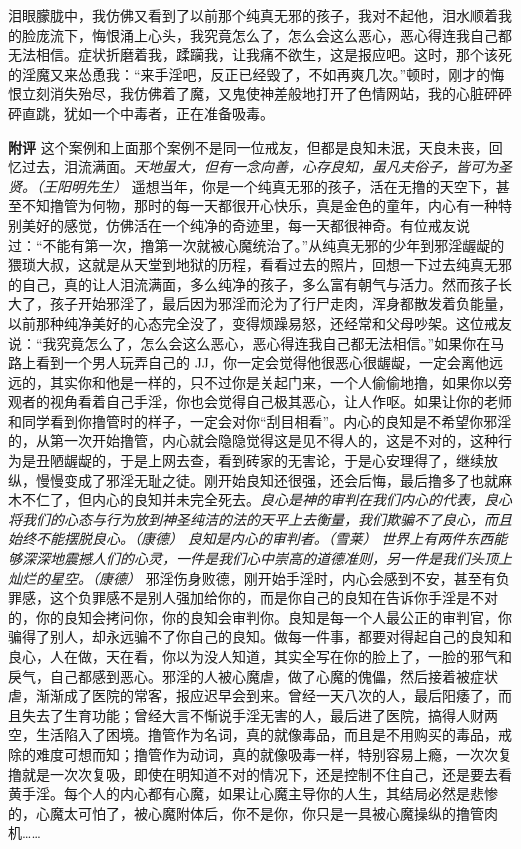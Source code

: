 \begin{case}
    泪眼朦胧中，我仿佛又看到了以前那个纯真无邪的孩子，我对不起他，泪水顺着我的脸庞流下，悔恨涌上心头，我究竟怎么了，怎么会这么恶心，恶心得连我自己都无法相信。症状折磨着我，蹂躏我，让我痛不欲生，这是报应吧。这时，那个该死的淫魔又来怂恿我：“来手淫吧，反正已经毁了，不如再爽几次。”顿时，刚才的悔恨立刻消失殆尽，我仿佛着了魔，又鬼使神差般地打开了色情网站，我的心脏砰砰砰直跳，犹如一个中毒者，正在准备吸毒。

    \textbf{附评} 这个案例和上面那个案例不是同一位戒友，但都是良知未泯，天良未丧，回忆过去，泪流满面。\textit{天地虽大，但有一念向善，心存良知，虽凡夫俗子，皆可为圣贤。（王阳明先生）} 遥想当年，你是一个纯真无邪的孩子，活在无撸的天空下，甚至不知撸管为何物，那时的每一天都很开心快乐，真是金色的童年，内心有一种特别美好的感觉，仿佛活在一个纯净的奇迹里，每一天都很神奇。有位戒友说过：“不能有第一次，撸第一次就被心魔统治了。”从纯真无邪的少年到邪淫龌龊的猥琐大叔，这就是从天堂到地狱的历程，看看过去的照片，回想一下过去纯真无邪的自己，真的让人泪流满面，多么纯净的孩子，多么富有朝气与活力。然而孩子长大了，孩子开始邪淫了，最后因为邪淫而沦为了行尸走肉，浑身都散发着负能量，以前那种纯净美好的心态完全没了，变得烦躁易怒，还经常和父母吵架。这位戒友说：“我究竟怎么了，怎么会这么恶心，恶心得连我自己都无法相信。”如果你在马路上看到一个男人玩弄自己的 JJ，你一定会觉得他很恶心很龌龊，一定会离他远远的，其实你和他是一样的，只不过你是关起门来，一个人偷偷地撸，如果你以旁观者的视角看着自己手淫，你也会觉得自己极其恶心，让人作呕。如果让你的老师和同学看到你撸管时的样子，一定会对你“刮目相看”。内心的良知是不希望你邪淫的，从第一次开始撸管，内心就会隐隐觉得这是见不得人的，这是不对的，这种行为是丑陋龌龊的，于是上网去查，看到砖家的无害论，于是心安理得了，继续放纵，慢慢变成了邪淫无耻之徒。刚开始良知还很强，还会后悔，最后撸多了也就麻木不仁了，但内心的良知并未完全死去。\textit{良心是神的审判在我们内心的代表，良心将我们的心态与行为放到神圣纯洁的法的天平上去衡量，我们欺骗不了良心，而且始终不能摆脱良心。（康德）} \textit{良知是内心的审判者。（雪莱）} \textit{世界上有两件东西能够深深地震撼人们的心灵，一件是我们心中崇高的道德准则，另一件是我们头顶上灿烂的星空。（康德）} 邪淫伤身败德，刚开始手淫时，内心会感到不安，甚至有负罪感，这个负罪感不是别人强加给你的，而是你自己的良知在告诉你手淫是不对的，你的良知会拷问你，你的良知会审判你。良知是每一个人最公正的审判官，你骗得了别人，却永远骗不了你自己的良知。做每一件事，都要对得起自己的良知和良心，人在做，天在看，你以为没人知道，其实全写在你的脸上了，一脸的邪气和戾气，自己都感到恶心。邪淫的人被心魔虐，做了心魔的傀儡，然后接着被症状虐，渐渐成了医院的常客，报应迟早会到来。曾经一天八次的人，最后阳痿了，而且失去了生育功能；曾经大言不惭说手淫无害的人，最后进了医院，搞得人财两空，生活陷入了困境。撸管作为名词，真的就像毒品，而且是不用购买的毒品，戒除的难度可想而知；撸管作为动词，真的就像吸毒一样，特别容易上瘾，一次次复撸就是一次次复吸，即使在明知道不对的情况下，还是控制不住自己，还是要去看黄手淫。每个人的内心都有心魔，如果让心魔主导你的人生，其结局必然是悲惨的，心魔太可怕了，被心魔附体后，你不是你，你只是一具被心魔操纵的撸管肉机……
\end{case}

